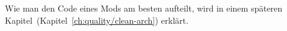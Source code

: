 \begin{Shaded}
\begin{Highlighting}[]
  \OperatorTok{=}
    \OperatorTok{(}\OperatorTok{(}\OperatorTok{)}  \OperatorTok{)}
\OperatorTok{(}\OperatorTok{)} 
\end{Highlighting}
\end{Shaded}

Wie man den Code eines Mods am besten aufteilt, wird in einem späteren
Kapitel~(Kapitel~\ref{ch:quality/clean-arch}) erklärt.
